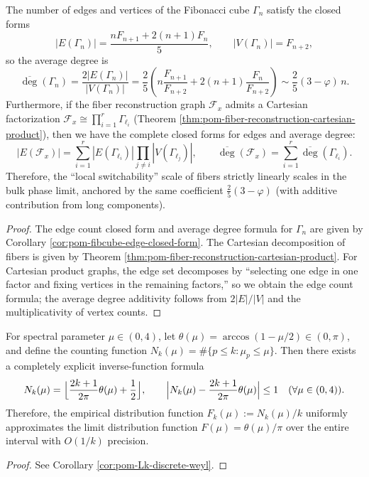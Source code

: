 \begin{conclusion}\label{con:xi-terminal-fibcube-edge-avg-degree-closed}
The number of edges and vertices of the Fibonacci cube \(\Gamma_n\) satisfy the closed forms
\[
|E(\Gamma_n)|=\frac{nF_{n+1}+2(n+1)F_n}{5},
\qquad
|V(\Gamma_n)|=F_{n+2},
\]
so the average degree is
\[
\overline{\deg}(\Gamma_n)
=\frac{2|E(\Gamma_n)|}{|V(\Gamma_n)|}
=\frac{2}{5}\left(
n\frac{F_{n+1}}{F_{n+2}}+2(n+1)\frac{F_n}{F_{n+2}}
\right)
\sim \frac{2}{5}(3-\varphi)\,n.
\]
Furthermore, if the fiber reconstruction graph \(\mathcal F_x\) admits a Cartesian factorization
\(
\mathcal F_x\cong\prod_{i=1}^r\Gamma_{\ell_i}
\)
(Theorem \ref{thm:pom-fiber-reconstruction-cartesian-product}), then we have the complete closed forms for edges and average degree:
\[
|E(\mathcal F_x)|
=\sum_{i=1}^r |E(\Gamma_{\ell_i})|\prod_{j\ne i}|V(\Gamma_{\ell_j})|,
\qquad
\overline{\deg}(\mathcal F_x)=\sum_{i=1}^r \overline{\deg}(\Gamma_{\ell_i}).
\]
Therefore, the ``local switchability'' scale of fibers strictly linearly scales in the bulk phase limit, anchored by the same coefficient \(\frac{2}{5}(3-\varphi)\) (with additive contribution from long components).
\end{conclusion}
\begin{proof}
The edge count closed form and average degree formula for \(\Gamma_n\) are given by Corollary \ref{cor:pom-fibcube-edge-closed-form}.
The Cartesian decomposition of fibers is given by Theorem \ref{thm:pom-fiber-reconstruction-cartesian-product}.
For Cartesian product graphs, the edge set decomposes by ``selecting one edge in one factor and fixing vertices in the remaining factors,'' so we obtain the edge count formula; the average degree additivity follows from
\(
2|E|/|V|
\)
and the multiplicativity of vertex counts.
\end{proof}

\begin{conclusion}\label{con:xi-terminal-discrete-weyl-strong-remainder}
For spectral parameter \(\mu\in(0,4)\), let \(\theta(\mu)=\arccos(1-\mu/2)\in(0,\pi)\), and define the counting function
\(
N_k(\mu)=\#\{p\le k:\mu_p\le\mu\}
\).
Then there exists a completely explicit inverse-function formula
\[
N_k(\mu)=\Bigl\lfloor \frac{2k+1}{2\pi}\theta(\mu)+\frac12\Bigr\rfloor,
\qquad
\Bigl|N_k(\mu)-\frac{2k+1}{2\pi}\theta(\mu)\Bigr|\le 1
\quad(\forall\mu\in(0,4)).
\]
Therefore, the empirical distribution function \(F_k(\mu):=N_k(\mu)/k\) uniformly approximates the limit distribution function \(F(\mu)=\theta(\mu)/\pi\) over the entire interval with \(O(1/k)\) precision.
\end{conclusion}
\begin{proof}
See Corollary \ref{cor:pom-Lk-discrete-weyl}.
\end{proof}

